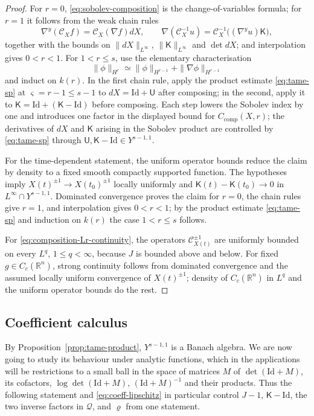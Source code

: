 \documentclass[11pt,reqno]{amsart}
\theoremstyle{plain}
\theoremstyle{definition}
\theoremstyle{remark}
\numberwithin{equation}{section}
\newcommand{\Ufield}{\mathsf U}
\newcommand{\Kmat}{\mathsf K}
\newcommand{\Real}{\mathbb R}
\newcommand{\Rn}{\Real^n}
\begin{document}
\begin{proof}
For $r=0$, \eqref{eq:sobolev-composition} is the change-of-variables formula;
for $r=1$ it follows from the weak chain rules
\begin{equation}\label{eq:pullback-chain-rule}
 \nabla^y(\mathcal C_Xf)=\mathcal C_X(\nabla f)dX,
 \qquad
 \nabla(\mathcal C_X^{-1}u)=\mathcal C_X^{-1}\big((\nabla^yu)\Kmat\big),
\end{equation}
together with the bounds on $\|dX\|_{L^\infty}$, $\|\Kmat\|_{L^\infty}$ and
$\det dX$; and interpolation gives $0<r<1$.  For $1<r\le s$, use the elementary
characterisation
\[
 \|\phi\|_{H^r}\simeq\|\phi\|_{H^{r-1}}+\|\nabla \phi\|_{H^{r-1}}
\]
and induct on $k(r)$.  In the first chain rule, apply the product estimate
\eqref{eq:tame-sp} at $\varsigma=r-1\le s-1$ to $dX=\mathrm{Id}+\Ufield$ after composing; in the second,
apply it to $\Kmat=\mathrm{Id}+(\Kmat-\mathrm{Id})$ before composing.
Each step lowers the Sobolev index by one and introduces one factor in the
displayed bound for $C_{\mathrm{comp}}(X,r)$; the derivatives of $dX$ and
$\Kmat$ arising in the Sobolev product are controlled by \eqref{eq:tame-sp}
through $\Ufield,\Kmat-\mathrm{Id}\in Y^{s-1,1}$.

For the time-dependent statement, the uniform operator bounds reduce the claim by
density to a fixed smooth compactly supported function.  The hypotheses imply
$X(t)^{\pm1}\to X(t_0)^{\pm1}$ locally uniformly and
$\Kmat(t)-\Kmat(t_0)\to0$ in $L^\infty\cap Y^{s-1,1}$.  Dominated
convergence proves the claim for $r=0$, the chain rules give $r=1$, and interpolation
gives $0<r<1$; by the product estimate \eqref{eq:tame-sp} and induction on $k(r)$ the case $1<r\le s$ follows.

For \eqref{eq:composition-Lr-continuity}, the operators
$\mathcal C_{X(t)}^{\pm1}$ are uniformly bounded on every $L^q$,
$1\le q<\infty$, because $J$ is bounded above and below. For fixed
$g\in C_c(\Rn)$, strong continuity follows from dominated convergence and the
assumed locally uniform convergence of $X(t)^{\pm1}$; density of $C_c(\Rn)$ in
$L^q$ and the uniform operator bounds do the rest.
\end{proof}


\subsection{Coefficient calculus}\label{ssec:coeffcalculus}

By Proposition~\ref{prop:tame-product}, $Y^{s-1,1}$ is a Banach algebra. We are now going to study its behaviour under analytic functions, which in the applications will be restrictions to a small ball in the space of matrices $M$ of $\det(\mathrm{Id}+M)$, its cofactors,
$\log\det(\mathrm{Id}+M)$, $(\mathrm{Id}+M)^{-1}$ and their products. Thus the following statement and \eqref{eq:coeff-lipschitz} in particular control $J-1$, $\Kmat-\mathrm{Id}$, the two
inverse factors in $\mathcal Q$, and $\varrho$ from one statement.
\end{document}
